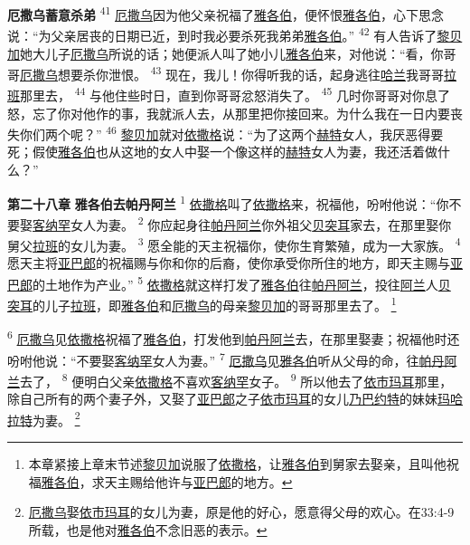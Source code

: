 \textbf{厄撒乌蓄意杀弟 }
\textsuperscript{41}
\uline{厄撒乌}因为他父亲祝福了\uline{雅各伯}，便怀恨\uline{雅各伯}，心下思念说：“为父亲居丧的日期已近，到时我必要杀死我弟弟\uline{雅各伯}。”
\textsuperscript{42}
有人告诉了\uline{黎贝加}她大儿子\uline{厄撒乌}所说的话；她便派人叫了她小儿\uline{雅各伯}来，对他说：“看，你哥哥\uline{厄撒乌}想要杀你泄恨。
\textsuperscript{43}
现在，我儿！你得听我的话，起身逃往\uline{哈兰}我哥哥\uline{拉班}那里去，
\textsuperscript{44}
与他住些时日，直到你哥哥忿怒消失了。
\textsuperscript{45}
几时你哥哥对你息了怒，忘了你对他作的事，我就派人去，从那里把你接回来。为什么我在一日内要丧失你们两个呢？”
\textsuperscript{46}
\uline{黎贝加}就对\uline{依撒格}说：“为了这两个\uline{赫特}女人，我厌恶得要死；假使\uline{雅各伯}也从这地的女人中娶一个像这样的\uline{赫特}女人为妻，我还活着做什么？”

\textbf{第二十八章 }
\textbf{雅各伯去帕丹阿兰 }
\textsuperscript{1}
\uline{依撒格}叫了\uline{依撒格}来，祝福他，吩咐他说：“你不要娶\uline{客纳罕}女人为妻。
\textsuperscript{2}
你应起身往\uline{帕丹阿兰}你外祖父\uline{贝突耳}家去，在那里娶你舅父\uline{拉班}的女儿为妻。
\textsuperscript{3}
愿全能的天主祝福你，使你生育繁殖，成为一大家族。
\textsuperscript{4}
愿天主将\uline{亚巴郎}的祝福赐与你和你的后裔，使你承受你所住的地方，即天主赐与\uline{亚巴郎}的土地作为产业。”
\textsuperscript{5}
\uline{依撒格}就这样打发了\uline{雅各伯}往\uline{帕丹阿兰}，投往\uline{阿兰}人\uline{贝突耳}的儿子\uline{拉班}，即\uline{雅各伯}和\uline{厄撒乌}的母亲\uline{黎贝加}的哥哥那里去了。
\footnote{本章紧接上章末节述\uline{黎贝加}说服了\uline{依撒格}，让\uline{雅各伯}到舅家去娶亲，且叫他祝福\uline{雅各伯}，求天主赐给他许与\uline{亚巴郎}的地方。}

\textsuperscript{6}
\uline{厄撒乌}见\uline{依撒格}祝福了\uline{雅各伯}，打发他到\uline{帕丹阿兰}去，在那里娶妻；祝福他时还吩咐他说：“不要娶\uline{客纳罕}女人为妻。”
\textsuperscript{7}
\uline{厄撒乌}见\uline{雅各伯}听从父母的命，往\uline{帕丹阿兰}去了，
\textsuperscript{8}
便明白父亲\uline{依撒格}不喜欢\uline{客纳罕}女子。
\textsuperscript{9}
所以他去了\uline{依市玛耳}那里，除自己所有的两个妻子外，又娶了\uline{亚巴郎}之子\uline{依市玛耳}的女儿\uline{乃巴约特}的妹妹\uline{玛哈}\uline{拉特}为妻。
\footnote{\uline{厄撒乌}娶\uline{依市}\uline{玛耳}的女儿为妻，原是他的好心，愿意得父母的欢心。在33:4-9所载，也是他对\uline{雅各伯}不念旧恶的表示。}

